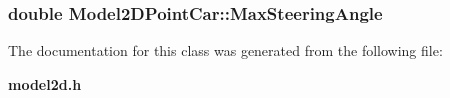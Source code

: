 \subsubsection{\setlength{\rightskip}{0pt plus 5cm}double Model2DPoint\-Car::Max\-Steering\-Angle}\label{class_Model2DPointCar_m0}




The documentation for this class was generated from the following file:\begin{CompactItemize}
\item 
{\bf model2d.h}\end{CompactItemize}
